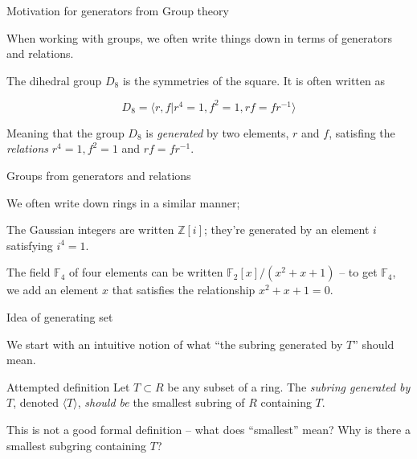 \documentclass{beamer}
\begin{document}
\begin{frame}{Motivation for generators from Group theory}

When working with groups, we often write things down in terms of generators and relations.

\begin{example}
The dihedral group $D_{8}$ is the symmetries of the square.  It is often written as

$$D_8=\langle r,f | r^4=1, f^2=1, rf=fr^{-1}\rangle $$

Meaning that the group $D_8$ is \emph{generated} by two elements, $r$ and $f$, satisfing the \emph{relations} $r^4=1, f^2=1$ and $rf=fr^{-1}$.
\end{example}

\end{frame}


\begin{frame}{Groups from generators and relations}

We often write down rings in a similar manner; 

\begin{example}
The Gaussian integers are written $\mathbb{Z}[i]$; they're generated by an element $i$ satisfying $i^4=1$.
\end{example}

\begin{example}
The field $\mathbb{F}_4$ of four elements can be written $\mathbb{F}_2[x]/(x^2+x+1)$ -- to get $\mathbb{F}_4$, we add an element $x$ that satisfies the relationship $x^2+x+1=0$.
\end{example}

\end{frame}


\begin{frame}{Idea of generating set}

We start with an intuitive notion of what ``the subring generated by $T$'' should mean.

\begin{block}{Attempted definition} Let $T\subset R$ be any subset of a ring.  The \emph{subring generated by $T$}, denoted $\langle T\rangle$, \emph{should be} the smallest subring of $R$ containing $T$.
\end{block}

This is not a good formal definition -- what does ``smallest'' mean?  Why is there a smallest subgring containing $T$? 


\end{frame}
\end{document}

